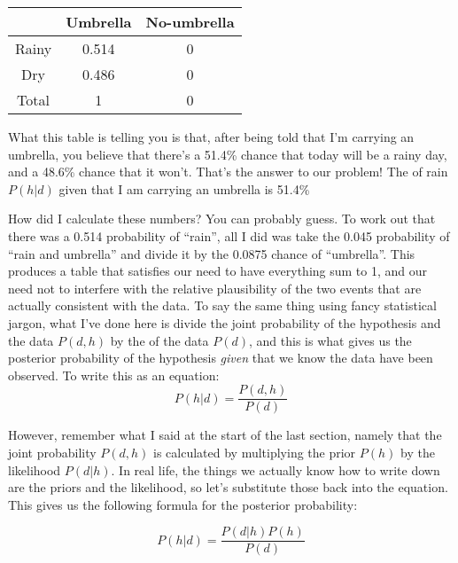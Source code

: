 \begin{center}
\begin{tabular}{c|cc}
& Umbrella & No-umbrella  \\ \hline
Rainy & 0.514 & 0   \\
Dry & 0.486 & 0    \\ \hline
Total & 1 & 0 
\end{tabular}
\end{center}

\noindent
What this table is telling you is that, after being told that I'm carrying an umbrella, you believe that there's a 51.4\% chance that today will be a rainy day, and a 48.6\% chance that it won't. That's the answer to our problem! The  of rain $P(h|d)$ given that I am carrying an umbrella is 51.4\%

How did I calculate these numbers? You can probably guess. To work out that there was a 0.514 probability of ``rain'', all I did was take the 0.045 probability of ``rain and umbrella'' and divide it by the 0.0875 chance of ``umbrella''. This produces a table that satisfies our need to have everything sum to 1, and our need not to interfere with the relative plausibility of the two events that are actually consistent with the data. To say the same thing using fancy statistical jargon, what I've done here is divide the joint probability of the hypothesis and the data $P(d,h)$ by the  of the data $P(d)$, and this is what gives us the posterior probability of the hypothesis {\it given} that we know the data have been observed. To write this as an equation:
$$
P(h | d) = \frac{P(d,h)}{P(d)}
$$


\noindent
However, remember what I said at the start of the last section, namely that the joint probability $P(d,h)$ is calculated by multiplying the prior $P(h)$ by the likelihood $P(d|h)$. In real life, the things we actually know how to write down are the priors and the likelihood, so let's substitute those back into the equation. This gives us the following formula for the posterior probability:

$$
P(h | d) = \frac{P(d|h) P(h)}{P(d)}
$$

